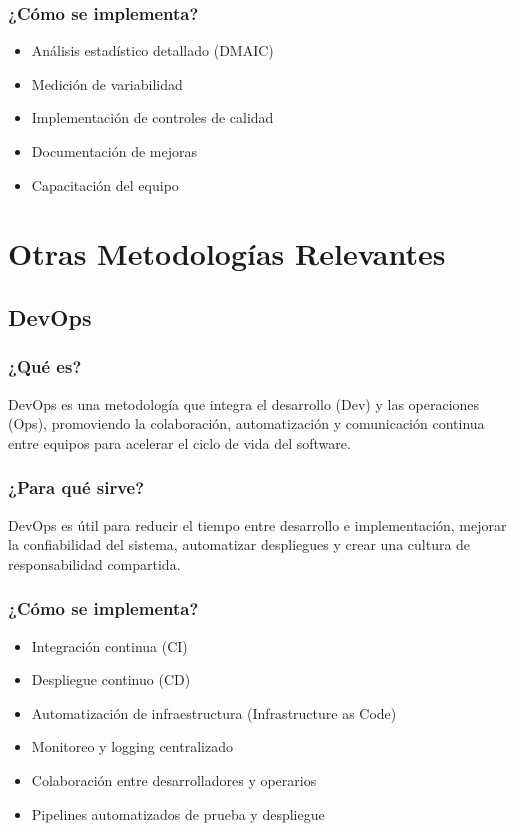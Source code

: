 \documentclass[12pt, a4paper]{article}
\begin{document}
\subsubsection{¿Cómo se implementa?}
\begin{itemize}
    \item Análisis estadístico detallado (DMAIC)
    \item Medición de variabilidad
    \item Implementación de controles de calidad
    \item Documentación de mejoras
    \item Capacitación del equipo
\end{itemize}

\section{Otras Metodologías Relevantes}

\subsection{DevOps}

\subsubsection{¿Qué es?}
DevOps es una metodología que integra el desarrollo (Dev) y las operaciones (Ops), promoviendo la colaboración, automatización y comunicación continua entre equipos para acelerar el ciclo de vida del software.

\subsubsection{¿Para qué sirve?}
DevOps es útil para reducir el tiempo entre desarrollo e implementación, mejorar la confiabilidad del sistema, automatizar despliegues y crear una cultura de responsabilidad compartida.

\subsubsection{¿Cómo se implementa?}
\begin{itemize}
    \item Integración continua (CI)
    \item Despliegue continuo (CD)
    \item Automatización de infraestructura (Infrastructure as Code)
    \item Monitoreo y logging centralizado
    \item Colaboración entre desarrolladores y operarios
    \item Pipelines automatizados de prueba y despliegue
\end{itemize}
\end{document}
